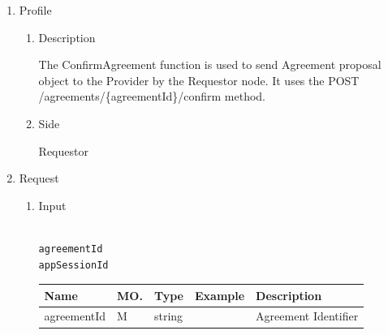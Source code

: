 \newpage



\begin{enumerate}

\item Profile

\begin{enumerate}

\item Description

The ConfirmAgreement function is used to send Agreement proposal object to the Provider by the Requestor node. 
It uses the POST /agreements/\{agreementId\}/confirm method.

\item Side

Requestor

\end{enumerate}

\item Request

\begin{enumerate}

\item Input

\begin{tcolorbox}[boxrule=0pt, frame empty]
\begin{verbatim}

agreementId
appSessionId

\end{verbatim}
\end{tcolorbox}


\begin{table}[H]
\footnotesize

\begin{center}
\begin{tabular}{|p{3cm}|l|p{3cm}|p{3cm}|p{4cm}|} 
\hline
\rowcolor{lightgray}	Name	& MO.	& Type	& Example & 	Description \\
\hline

agreementId		& M & 	string				&		& 	Agreement Identifier \\
\hline


\end{tabular}
\end{center}
\end{table}
\end{enumerate}
\end{enumerate}

